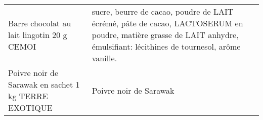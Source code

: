 \begin{longtable}{p{5cm}p{10cm}}
                                                               Barre chocolat au lait lingotin 20 g CEMOI &                                                                                                                                                                                                                                                                                                                                                                                                                                                                                                                                                                                                                                                                                                                                                                                                                                                                 sucre, beurre de cacao, poudre de LAIT écrémé, pâte de cacao, LACTOSERUM en poudre, matière grasse de LAIT anhydre, émulsifiant: lécithines de tournesol, arôme vanille. \\
                                                     Poivre noir de Sarawak en sachet 1 kg TERRE EXOTIQUE &                                                                                                                                                                                                                                                                                                                                                                                                                                                                                                                                                                                                                                                                                                                                                                                                                                                                                                                                                                                                                   Poivre noir de Sarawak \\

\end{longtable}
